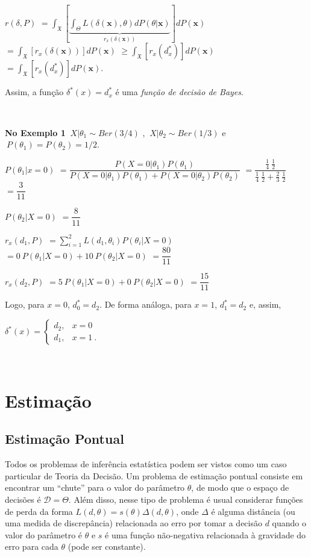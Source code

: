 \documentclass[
]{book}
\begin{document}
\(r(\delta,P)\) \(=\displaystyle \int_{\mathfrak{X}} \left[ \underbrace{\int_\Theta L\left(\delta(\boldsymbol x),\theta\right) dP(\theta|\boldsymbol x)}_{r_x\left(\delta(\boldsymbol x)\right)} \right]dP(\boldsymbol x)\) \(=\displaystyle \int_{\mathfrak{X}} \left[ {r_x\left(\delta(\boldsymbol x)\right)} \right]dP(\boldsymbol x)\) \(\geq \displaystyle \int_{\mathfrak{X}} \left[ {r_x\left({d}_x^*\right)} \right]dP(\boldsymbol x)\) \(= \displaystyle \int_{\mathfrak{X}} \left[ {r_x\left({d}_x^*\right)} \right]dP(\boldsymbol x)\).

Assim, a função \({\delta}^*(x)={d}^*_{x}\) é uma \emph{função de decisão de Bayes}.

\(~\)

\textbf{No Exemplo 1} \(~X|\theta_1 \sim Ber(3/4)\) , \(~X|\theta_2 \sim Ber(1/3)\) e \(~P(\theta_1)=P(\theta_2)=1/2\).

\(P(\theta_1|x=0)\) \(=\dfrac{P(X=0|\theta_1)P(\theta_1)}{P(X=0|\theta_1)P(\theta_1)+P(X=0|\theta_2)P(\theta_2)}\) \(=\dfrac{\frac{1}{4}~\frac{1}{2}}{\frac{1}{4}~\frac{1}{2}+\frac{2}{3}~\frac{1}{2}}\) \(=\dfrac{3}{11}\)

\(P(\theta_2|X=0)\) \(=\dfrac{8}{11}\)

\(r_x(d_1,P)\) \(=\displaystyle \sum_{i=1}^2L(d_1,\theta_i)P(\theta_i|X=0)\) \(=0~P(\theta_1|X=0)+10~P(\theta_2|X=0)\) \(=\dfrac{80}{11}\)

\(r_x(d_2,P)\) \(=5~P(\theta_1|X=0)+0~P(\theta_2|X=0)\) \(=\dfrac{15}{11}\)

Logo, para \(x=0\), \({d}_0^*={d}_2\). De forma análoga, para \(x=1\), \({d}_1^*={d}_2\) e, assim,

\({\delta}^*(x)=\left\{\begin{array}{rl} {d}_2, & x=0\\ {d}_1, & x=1~.\end{array}\right.\)

\(~\)

\hypertarget{Estimacao}{%
\chapter{Estimação}\label{Estimacao}}

\hypertarget{estimauxe7uxe3o-pontual}{%
\section{Estimação Pontual}\label{estimauxe7uxe3o-pontual}}

Todos os problemas de inferência estatística podem ser vistos como um caso particular de Teoria da Decisão. Um problema de estimação pontual consiste em encontrar um ``chute'' para o valor do parâmetro \(\theta\), de modo que o espaço de decisões é \(\mathcal{D}=\Theta\). Além disso, nesse tipo de problema é usual considerar funções de perda da forma \(L(d,\theta)=s(\theta)\Delta(d,\theta)\), onde \(\Delta\) é alguma distância (ou uma medida de discrepância) relacionada ao erro por tomar a decisão \(d\) quando o valor do parâmetro é \(\theta\) e \(s\) é uma função não-negativa relacionada à gravidade do erro para cada \(\theta\) (pode ser constante).
\end{document}
